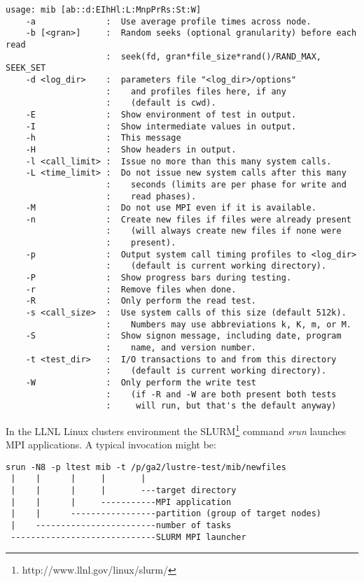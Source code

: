 \documentclass{article}
\begin{document}
\begin{verbatim}
usage: mib [ab::d:EIhHl:L:MnpPrRs:St:W]
    -a              :  Use average profile times across node.
    -b [<gran>]     :  Random seeks (optional granularity) before each read
                    :  seek(fd, gran*file_size*rand()/RAND_MAX, SEEK_SET
    -d <log_dir>    :  parameters file "<log_dir>/options"
                    :    and profiles files here, if any 
                    :    (default is cwd).
    -E              :  Show environment of test in output.
    -I              :  Show intermediate values in output.
    -h              :  This message
    -H              :  Show headers in output.
    -l <call_limit> :  Issue no more than this many system calls.
    -L <time_limit> :  Do not issue new system calls after this many
                    :    seconds (limits are per phase for write and
                    :    read phases).
    -M              :  Do not use MPI even if it is available.
    -n              :  Create new files if files were already present
                    :    (will always create new files if none were
                    :    present).
    -p              :  Output system call timing profiles to <log_dir>
                    :    (default is current working directory).
    -P              :  Show progress bars during testing.
    -r              :  Remove files when done.
    -R              :  Only perform the read test.
    -s <call_size>  :  Use system calls of this size (default 512k).
                    :    Numbers may use abbreviations k, K, m, or M.
    -S              :  Show signon message, including date, program
                    :    name, and version number.
    -t <test_dir>   :  I/O transactions to and from this directory
                    :    (default is current working directory).
    -W              :  Only perform the write test
                    :    (if -R and -W are both present both tests 
                    :     will run, but that's the default anyway)
\end{verbatim}

In the LLNL Linux clusters environment the
SLURM\footnote{http://www.llnl.gov/linux/slurm/} command {\em srun}
launches MPI applications.  A typical invocation might be:

\begin{verbatim}
srun -N8 -p ltest mib -t /p/ga2/lustre-test/mib/newfiles
 |    |      |     |       |
 |    |      |     |       ---target directory
 |    |      |     -----------MPI application
 |    |      -----------------partition (group of target nodes)
 |    ------------------------number of tasks
 -----------------------------SLURM MPI launcher
\end{verbatim}
\end{document}
